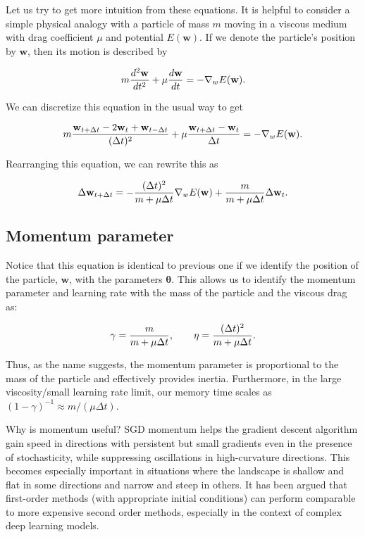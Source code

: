 \documentclass[%
oneside,                 %
final,                   %
10pt]{article}
\begin{document}
Let us try to get more intuition from these equations. It is helpful
to consider a simple physical analogy with a particle of mass $m$
moving in a viscous medium with drag coefficient $\mu$ and potential
$E(\mathbf{w})$. If we denote the particle's position by $\mathbf{w}$,
then its motion is described by

\[
m {d^2 \mathbf{w} \over dt^2} + \mu {d \mathbf{w} \over dt }= -\nabla_w E(\mathbf{w}).
\]

We can discretize this equation in the usual way to get

\[
m { \mathbf{w}_{t+\Delta t}-2 \mathbf{w}_{t} +\mathbf{w}_{t-\Delta t} \over (\Delta t)^2}+\mu {\mathbf{w}_{t+\Delta t}- \mathbf{w}_{t} \over \Delta t} = -\nabla_w E(\mathbf{w}).
\]

Rearranging this equation, we can rewrite this as

\[
\Delta \mathbf{w}_{t +\Delta t}= - { (\Delta t)^2 \over m +\mu \Delta t} \nabla_w E(\mathbf{w})+ {m \over m +\mu \Delta t} \Delta \mathbf{w}_t.
\]

\subsection{Momentum parameter}

Notice that this equation is identical to previous one if we identify
the position of the particle, $\mathbf{w}$, with the parameters
$\boldsymbol{\theta}$. This allows us to identify the momentum
parameter and learning rate with the mass of the particle and the
viscous drag as:

\[
\gamma= {m \over m +\mu \Delta t }, \qquad \eta = {(\Delta t)^2 \over m +\mu \Delta t}.
\]

Thus, as the name suggests, the momentum parameter is proportional to
the mass of the particle and effectively provides inertia.
Furthermore, in the large viscosity/small learning rate limit, our
memory time scales as $(1-\gamma)^{-1} \approx m/(\mu \Delta t)$.

Why is momentum useful? SGD momentum helps the gradient descent
algorithm gain speed in directions with persistent but small gradients
even in the presence of stochasticity, while suppressing oscillations
in high-curvature directions. This becomes especially important in
situations where the landscape is shallow and flat in some directions
and narrow and steep in others. It has been argued that first-order
methods (with appropriate initial conditions) can perform comparable
to more expensive second order methods, especially in the context of
complex deep learning models.
\end{document}
